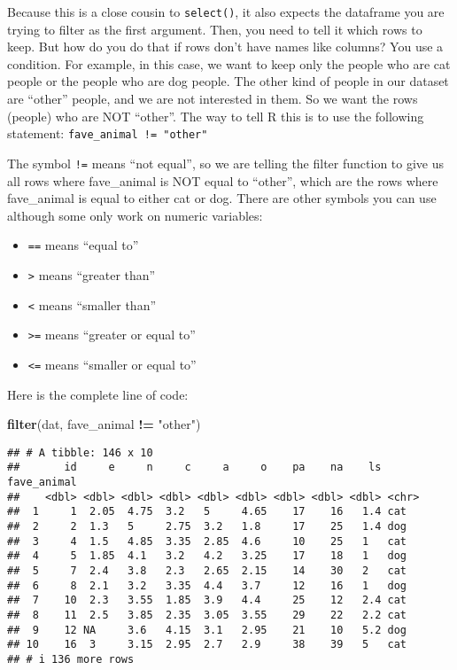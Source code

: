 \documentclass[
]{article}
\newenvironment{Shaded}{\begin{snugshade}}{\end{snugshade}}
\newcommand{\FunctionTok}[1]{\textcolor[rgb]{0.13,0.29,0.53}{\textbf{#1}}}
\newcommand{\NormalTok}[1]{#1}
\newcommand{\SpecialCharTok}[1]{\textcolor[rgb]{0.81,0.36,0.00}{\textbf{#1}}}
\newcommand{\StringTok}[1]{\textcolor[rgb]{0.31,0.60,0.02}{#1}}
\providecommand{\tightlist}{%
  \setlength{\itemsep}{0pt}\setlength{\parskip}{0pt}}
\begin{document}
Because this is a close cousin to \texttt{select()}, it also expects the
dataframe you are trying to filter as the first argument. Then, you need
to tell it which rows to keep. But how do you do that if rows don't have
names like columns? You use a condition. For example, in this case, we
want to keep only the people who are cat people or the people who are
dog people. The other kind of people in our dataset are ``other''
people, and we are not interested in them. So we want the rows (people)
who are NOT ``other''. The way to tell R this is to use the following
statement: \texttt{fave\_animal\ !=\ "other"}

The symbol \texttt{!=} means ``not equal'', so we are telling the filter
function to give us all rows where fave\_animal is NOT equal to
``other'', which are the rows where fave\_animal is equal to either cat
or dog. There are other symbols you can use although some only work on
numeric variables:

\begin{itemize}
\tightlist
\item
  \texttt{==} means ``equal to''
\item
  \texttt{\textgreater{}} means ``greater than''
\item
  \texttt{\textless{}} means ``smaller than''
\item
  \texttt{\textgreater{}=} means ``greater or equal to''
\item
  \texttt{\textless{}=} means ``smaller or equal to''
\end{itemize}

Here is the complete line of code:

\begin{Shaded}
\begin{Highlighting}[]
\FunctionTok{filter}\NormalTok{(dat, fave\_animal }\SpecialCharTok{!=} \StringTok{"other"}\NormalTok{)}
\end{Highlighting}
\end{Shaded}

\begin{verbatim}
## # A tibble: 146 x 10
##       id     e     n     c     a     o    pa    na    ls fave_animal
##    <dbl> <dbl> <dbl> <dbl> <dbl> <dbl> <dbl> <dbl> <dbl> <chr>      
##  1     1  2.05  4.75  3.2   5     4.65    17    16   1.4 cat        
##  2     2  1.3   5     2.75  3.2   1.8     17    25   1.4 dog        
##  3     4  1.5   4.85  3.35  2.85  4.6     10    25   1   cat        
##  4     5  1.85  4.1   3.2   4.2   3.25    17    18   1   dog        
##  5     7  2.4   3.8   2.3   2.65  2.15    14    30   2   cat        
##  6     8  2.1   3.2   3.35  4.4   3.7     12    16   1   dog        
##  7    10  2.3   3.55  1.85  3.9   4.4     25    12   2.4 cat        
##  8    11  2.5   3.85  2.35  3.05  3.55    29    22   2.2 cat        
##  9    12 NA     3.6   4.15  3.1   2.95    21    10   5.2 dog        
## 10    16  3     3.15  2.95  2.7   2.9     38    39   5   cat        
## # i 136 more rows
\end{verbatim}
\end{document}
